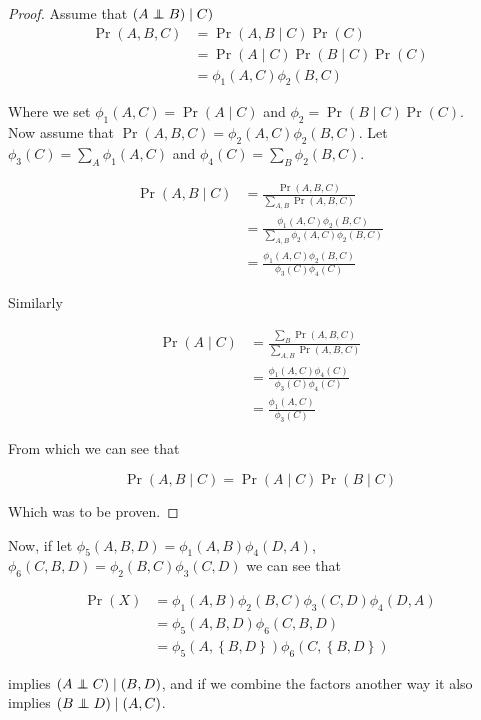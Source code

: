 \documentclass{article}
\newcommand\independent{\protect\mathpalette{\protect\independenT}{\perp}}
\def\independenT#1#2{\mathrel{\rlap{$#1#2$}\mkern2mu{#1#2}}}
\begin{document}
\begin{proof}
Assume that $(A\independent B) \mid C)$
\begin{align}
\Pr(A,B,C) &= \Pr(A,B \mid C)\Pr(C) \\
&= \Pr(A \mid C)\Pr(B \mid C)\Pr(C) \\
&= \phi_1(A,C)\phi_2(B,C)
\end{align}

Where we set $\phi_1(A,C) = \Pr(A \mid C)$ and $\phi_2 = \Pr(B \mid
C)\Pr(C)$. \\

Now assume that $\Pr(A,B,C) = \phi_2(A,C)\phi_2(B,C)$. Let
$\phi_3(C)=\sum_A\phi_1(A,C)$ and $\phi_4(C)=\sum_B\phi_2(B,C)$.

\begin{align}
\Pr(A,B \mid C) &= \frac{\Pr(A,B,C)}{\sum_{A,B}\Pr(A,B,C)} \\
&= \frac{\phi_1(A,C)\phi_2(B,C)}{\sum_{A,B}\phi_2(A,C)\phi_2(B,C)} \\
&= \frac{\phi_1(A,C)\phi_2(B,C)}{\phi_3(C)\phi_4(C)}
\end{align}

Similarly

\begin{align}
\Pr(A \mid C) &= \frac{\sum_B\Pr(A,B,C)}{\sum_{A,B}\Pr(A,B,C)} \\
&= \frac{\phi_1(A,C)\phi_4(C)}{\phi_3(C)\phi_4(C)} \\
&= \frac{\phi_1(A,C)}{\phi_3(C)}
\end{align}

From which we can see that 

\begin{equation}
\Pr(A,B \mid C) = \Pr(A \mid C)\Pr(B \mid C)
\end{equation}

Which was to be proven.
\end{proof}

Now, if let $\phi_5(A,B,D) = \phi_1(A,B)\phi_4(D,A)$, $\phi_6(C,B,D) = \phi_2(B,C)\phi_3(C,D)$ we can see that 

\begin{align}
\Pr(X) &= \phi_1(A,B)\phi_2(B,C)\phi_3(C,D)\phi_4(D,A) \\
&= \phi_5(A,B,D)\phi_6(C,B,D) \\
&= \phi_5(A,\left\{B,D\right\})\phi_6(C,\left\{B,D\right\})
\end{align}

implies $(A\independent C) \mid (B,D)$, and if we combine the factors 
another way it also implies $(B\independent D) \mid (A,C)$.
\end{document}
